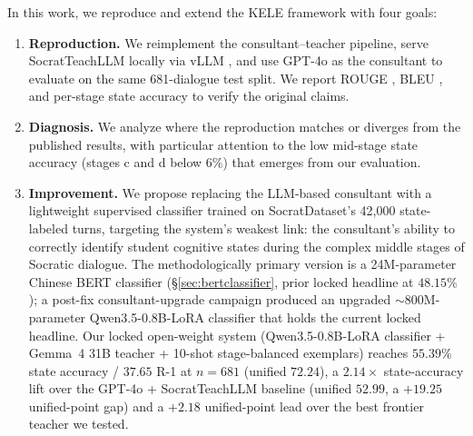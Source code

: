 \documentclass[11pt]{article}
\begin{document}
In this work, we reproduce and extend the KELE framework with four goals:

\begin{enumerate}
    \item \textbf{Reproduction.} We reimplement the consultant--teacher pipeline, serve SocratTeachLLM locally via vLLM \citep{kwon2023vllm}, and use GPT-4o \citep{openai2024gpt4o} as the consultant to evaluate on the same 681-dialogue test split. We report ROUGE \citep{lin2004rouge}, BLEU \citep{papineni2002bleu}, and per-stage state accuracy to verify the original claims.
    \item \textbf{Diagnosis.} We analyze where the reproduction matches or diverges from the published results, with particular attention to the low mid-stage state accuracy (stages c and d below 6\%) that emerges from our evaluation.
    \item \textbf{Improvement.} We propose replacing the LLM-based consultant with a lightweight supervised classifier trained on SocratDataset's 42,000 state-labeled turns, targeting the system's weakest link: the consultant's ability to correctly identify student cognitive states during the complex middle stages of Socratic dialogue. The methodologically primary version is a 24M-parameter Chinese BERT classifier (\S\ref{sec:bertclassifier}, prior locked headline at $48.15\%$); a post-fix consultant-upgrade campaign produced an upgraded $\sim$800M-parameter Qwen3.5-0.8B-LoRA classifier that holds the current locked headline. Our locked open-weight system (Qwen3.5-0.8B-LoRA classifier + Gemma~4 31B teacher + 10-shot stage-balanced exemplars) reaches $\mathbf{55.39\%}$ state accuracy / $\mathbf{37.65}$ R-1 at $n{=}681$ (unified $\mathbf{72.24}$), a $\mathbf{2.14\times}$ state-accuracy lift over the GPT-4o + SocratTeachLLM baseline (unified $52.99$, a $+19.25$ unified-point gap) and a $+2.18$ unified-point lead over the best frontier teacher we tested.

\end{enumerate}
\end{document}
